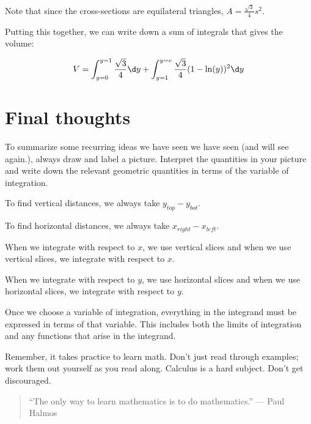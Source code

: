 \documentclass{ximera}
\begin{document}
\begin{example}
\begin{explanation}
Note that since the cross-sections are equilateral triangles, $A= \frac{\sqrt{3}}{4}s^2$.

Putting this together, we can write down a sum of integrals that gives the volume:

\[V= \int_{y= 0}^{y=1}\frac{\sqrt{3}}{4} \d y + \int_{y= 1}^{y=e} \frac{\sqrt{3}}{4}(1-\ln(y))^2 \d y \]

            
            
\end{explanation}            
\end{example}

\section{Final thoughts}
To summarize some recurring ideas we have seen we have seen (and will see again.), always draw and label a picture.  Interpret the quantities in your picture and write down the relevant geometric quantities in terms of the variable of integration.


\begin{fact}
To find vertical distances, we always take $y_{top} - y_{bot}$.

To find horizontal distances, we always take $x_{right}-x_{left}$.
\end{fact}

\begin{fact}
When we integrate with respect to $x$, we use vertical slices and when we use vertical slices, we integrate with respect to $x$.

When we integrate with respect to $y$, we use horizontal slices and when we use horizontal slices, we integrate with respect to $y$.
\end{fact}

\begin{fact}
Once we choose a variable of integration, everything in the integrand must be expressed in terms of that variable.  This includes both the limits of integration and any functions that arise in the integrand.
\end{fact}

Remember, it takes practice to learn math.  Don't just read through examples; work them out yourself as you read along. Calculus is a hard subject. Don't get discouraged.

\begin{quote}
``The only way to learn mathematics is to do mathematics.'' --- Paul Halmos
\end{quote}
\end{document}
